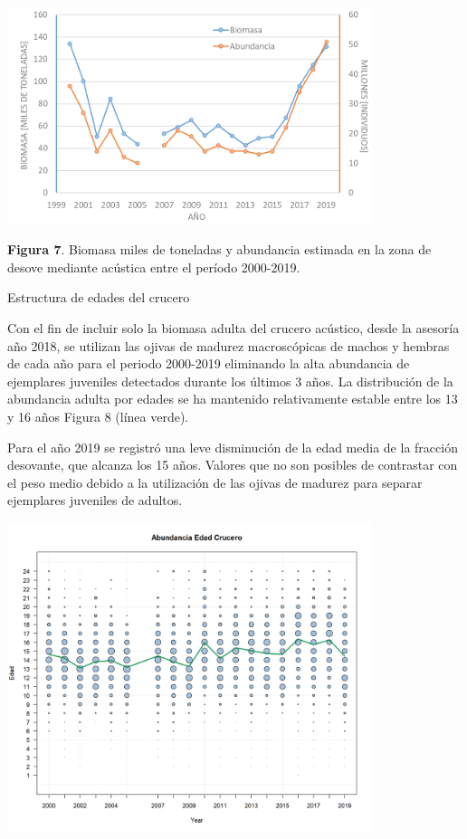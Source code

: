 \documentclass[
  spanish,
]{article}
\begin{document}
\begin{center}
\includegraphics[width=0.8\textwidth]{Figuras/Figura_7.png}
\end{center}

\small \textbf{Figura 7}. Biomasa miles de toneladas y abundancia
estimada en la zona de desove mediante acústica entre el período
2000-2019. \vspace{0.5cm} \normalsize

Estructura de edades del crucero

Con el fin de incluir solo la biomasa adulta del crucero acústico, desde
la asesoría año 2018, se utilizan las ojivas de madurez macroscópicas de
machos y hembras de cada año para el periodo 2000-2019 eliminando la
alta abundancia de ejemplares juveniles detectados durante los últimos 3
años. La distribución de la abundancia adulta por edades se ha mantenido
relativamente estable entre los 13 y 16 años Figura 8 (línea verde).

Para el año 2019 se registró una leve disminución de la edad media de la
fracción desovante, que alcanza los 15 años. Valores que no son posibles
de contrastar con el peso medio debido a la utilización de las ojivas de
madurez para separar ejemplares juveniles de adultos.

\begin{center}
\includegraphics[width=0.8\textwidth]{Figuras/Figura_8.png}
\end{center}
\end{document}
